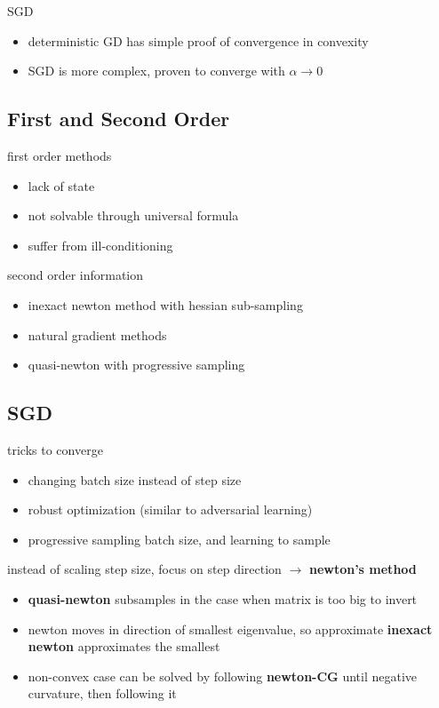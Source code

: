 \documentclass[]{article}
\theoremstyle{definition}
\begin{document}
    SGD
    \begin{itemize}
        \item deterministic GD has simple proof of convergence in convexity
        \item SGD is more complex, proven to converge with $\alpha \to 0$
    \end{itemize}

    \subsection{First and Second Order}%
    \label{sub:}
    first order methods
    \begin{itemize}
        \item lack of state
        \item not solvable through universal formula
        \item suffer from ill-conditioning
    \end{itemize}

    second order information
    \begin{itemize}
        \item inexact newton method with hessian sub-sampling
        \item natural gradient methods
        \item quasi-newton with progressive sampling
    \end{itemize}

    \subsection{SGD}%
    \label{sub:sgd}

    tricks to converge
    \begin{itemize}
        \item changing batch size instead of step size
        \item robust optimization (similar to adversarial learning)
        \item progressive sampling batch size, and learning to sample
    \end{itemize}

    instead of scaling step size, focus on step direction $\to $ \textbf{newton's method}
    \begin{itemize}
        \item \textbf{quasi-newton} subsamples in the case when matrix is too big to invert
        \item newton moves in direction of smallest eigenvalue, so approximate \textbf{inexact newton} approximates the smallest
        \item non-convex case can be solved by following \textbf{newton-CG} until negative curvature, then following it
    \end{itemize}
\end{document}
